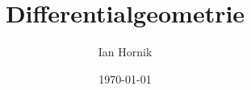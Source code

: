 \documentclass[letterpaper, 12pt]{article}
\newcommand{\1}{\mathds{1}}
\theoremstyle{definition}
\begin{document}
\title{Differentialgeometrie \\[0.3em]}



\author{\normalsize Ian Hornik}
\date{\vspace{-0.8em}\normalsize\today}



\maketitle
\tableofcontents\label{sec:contents}
\end{document}
